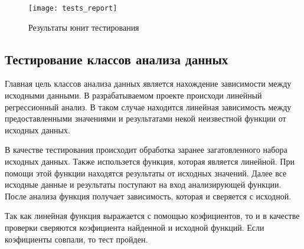 \begin{figure}
    \centering
    \texttt{[image: tests\_report]}
    \caption{Результаты юнит тестирования}
    \label{pic:lit_testing:tests_report}
\end{figure}

\subsection{Тестирование классов анализа данных}

Главная цель классов анализа данных является нахождение зависимости между исходными данными.
В разрабатываемом проекте происходи линейный регрессионный анализ.
В таком случае находится линейная зависимость между предоставленными значениями и результатами некой неизвестной функции от исходных данных.

В качестве тестирования происходит обработка заранее загатовленного набора исходных данных.
Также использется функция, которая является линейной.
При помощи этой функции находятся результаты от исходных значений.
Далее все исходные данные и результаты поступают на вход анализирующей функции.
После анализа функция получает зависимость, которая и сверяется с исходной.

Так как линейная функция выражается с помощью коэфициентов, то и в качестве проверки сверяются коэфициента найденной и исходной функций.
Если коэфициенты совпали, то тест пройден.